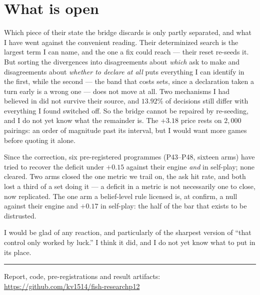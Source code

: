 \documentclass[11pt,a4paper]{article}
\begin{document}
\section{What is open}

Which piece of their state the bridge discards is only partly separated, and
what I have went against the convenient reading. Their determinized search is
the largest term I can name, and the one a fix could reach --- their reset
re-seeds it. But sorting the divergences into disagreements about \emph{which}
ask to make and disagreements about \emph{whether to declare at all} puts
everything I can identify in the first, while the second --- the band that
costs sets, since a declaration taken a turn early is a wrong one --- does not
move at all. Two mechanisms I had believed in did not survive their source, and
$13.92\%$ of decisions still differ with everything I found switched off. So
the bridge cannot be repaired by re-seeding, and I do not yet know what the
remainder is. The $+3.18$ price rests on $2{,}000$ pairings: an order of
magnitude past its interval, but I would want more games before quoting it
alone.

Since the correction, six pre-registered programmes (P43--P48, sixteen
arms) have tried to recover the deficit under $+0.15$ against their engine
\emph{and} in self-play; none cleared. Two arms closed the one metric we trail
on, the ask hit rate, and both lost a third of a set doing it --- a deficit in
a metric is not necessarily one to close, now replicated. The one arm a
belief-level rule licensed is, at confirm, a null against their engine and
$+0.17$ in self-play: the half of the bar that exists to be distrusted.

I would be glad of any reaction, and particularly of the sharpest version of
``that control only worked by luck.'' I think it did, and I do not yet know
what to put in its place.

\vspace{0.4em}
\hrule
\vspace{0.1em}

{\small Report, code, pre-registrations and result artifacts:
\url{https://github.com/kv1514/fish-researchp12}}
\end{document}
